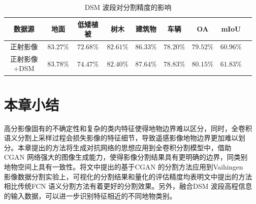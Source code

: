 \begin{table}[htbp]
  \caption{DSM 波段对分割精度的影响}\label{tab:dsm_affect}
  \centering
  \begin{tabular}{ccccccccc}
    \toprule
   数据源             & 地面 & 低矮植被 & 树木 & 建筑物 & 车辆 & OA & mIoU \\
    \midrule
    正射影像     & $83.27\%$ & $72.68\%$ & $82.61\%$ & $86.33\%$ & $78.20\%$   & $79.52\%$ & $60.96\%$ \\
    正射影像+DSM & $83.78\%$ & $74.47\%$ & $82.40\%$ & $87.64\%$ & $78.83\%$ & $80.15\%$ & \textbf{$61.83\%$} \\
    \bottomrule
  \end{tabular}
\end{table}

\section{本章小结}
\label{sec:forth}
高分影像固有的不确定性和复杂的类内特征使得地物边界难以区分，同时，全卷积语义分割上采样过程会损失影像的特征细节，导致遥感影像地物边界更加难以划分。本章提出的方法将生成对抗网络的思想应用到全卷积分割模型中，借助CGAN 网络强大的图像生成能力，使得影像分割结果具有更明确的边界，同类别地物空间上具有一致性。将文中提出的基于CGAN 的分割方法应用到Vaihingen 影像数据分割实验上，可视化的分割结果和量化的评估精度均表明文中提出的方法相比传统FCN 语义分割方法有着更好的分割效果。另外，融合DSM 波段高程信息的输入数据，可以进一步识别特征相近的不同地物类别。
